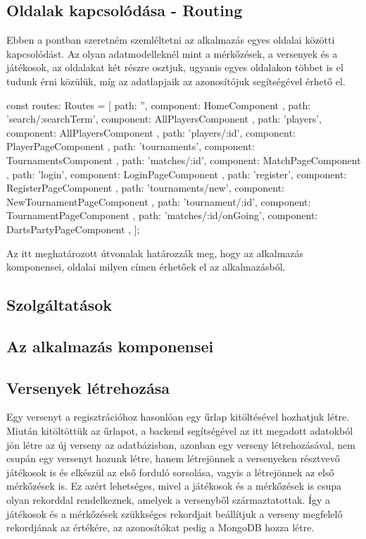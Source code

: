 \subsection{Oldalak kapcsolódása - Routing}
Ebben a pontban szeretném szemléltetni az alkalmazás egyes oldalai közötti kapcsolódást. Az olyan adatmodelleknél mint a mérkőzések, a versenyek és a játékosok, az oldalakat két részre osztjuk, ugyanis egyes oldalakon többet is el tudunk érni közülük, míg az adatlapjaik az azonosítójuk segítségével érhető el.
\begin{cpp}
const routes: Routes = [
  { path: '', component: HomeComponent },
  { path: 'search/:searchTerm', component: AllPlayersComponent },
  { path: 'players', component: AllPlayersComponent },
  { path: 'players/:id', component: PlayerPageComponent },
  { path: 'tournaments', component: TournamentsComponent },
  { path: 'matches/:id', component: MatchPageComponent },
  { path: 'login', component: LoginPageComponent },
  { path: 'register', component: RegisterPageComponent },
  { path: 'tournaments/new', component: NewTournamentPageComponent },
  { path: 'tournament/:id', component: TournamentPageComponent },
  { path: 'matches/:id/onGoing', component: DartsPartyPageComponent },
];
\end{cpp}
Az itt meghatározott útvonalak határozzák meg, hogy az alkalmazás komponensei, oldalai milyen címen érhetőek el az alkalmazásból.
\subsection{Szolgáltatások}
\subsection{Az alkalmazás komponensei}
\subsection{Versenyek létrehozása}
Egy versenyt a regisztrációhoz hasonlóan egy űrlap kitöltésével hozhatjuk létre. Miután kitöltöttük az űrlapot, a backend segítségével az itt megadott adatokból jön létre az új verseny az adatbázisban, azonban egy verseny létrehozásával, nem csupán egy versenyt hozunk létre, hanem létrejönnek a versenyeken résztvevő játékosok is és elkészül az első forduló sorsolása, vagyis a létrejönnek az első mérkőzések is. Ez azért lehetséges, mivel a játékosok és a mérkőzések is csupa olyan rekorddal rendelkeznek, amelyek a versenyből származtatottak. Így a játékosok és a mérkőzések szükkséges rekordjait beállítjuk a verseny megfelelő rekordjának az értékére, az azonosítókat pedig a MongoDB hozza létre.

